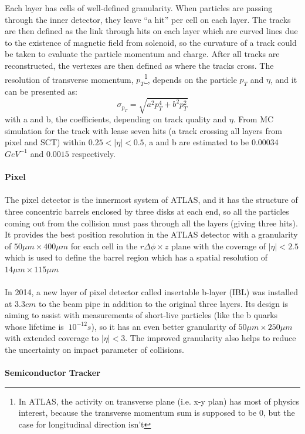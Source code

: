 Each layer has cells of well-defined granularity. When particles are passing through the inner detector, they leave ``a hit'' per cell on each layer. The tracks are then defined as the link through hits on each layer which are curved lines due to the existence of magnetic field from solenoid, so the curvature of a track could be taken to evaluate the particle momentum and charge. After all tracks are reconstructed, the vertexes are then defined as where the tracks cross. The resolution of transverse momentum, $p_{T}$\footnote{In ATLAS, the activity on transverse plane (i.e. x-y plan) has most of physics interest, because the transverse momentum sum is supposed to be 0, but the case for longitudinal direction isn't}, depends on the particle $p_{T}$ and $\eta$, and it can be presented as:
\begin{equation}
\sigma_{p_{T}} = \sqrt{a^{2}p_{T}^{4}+b^{2}p_{T}^{2}}
\end{equation}
with a and b, the coefficients, depending on track quality and $\eta$. From MC simulation for the track with lease seven hits (a track crossing all layers from pixel and SCT) within $0.25<|\eta|<0.5$, a and b are estimated to be 0.00034 $GeV^{-1}$ and $0.0015$ respectively.
\\
\\{\bf Pixel}
\\
\\The pixel detector is the innermost system of ATLAS, and it has the structure of three concentric barrels enclosed by three disks at each end, so all the particles coming out from the collision must pass through all the layers (giving three hits). It provides the best position resolution in the ATLAS detector with a granularity of $50\mu m\times 400\mu m$  for each cell in the $r\Delta \phi \times z$ plane with the coverage of $|\eta|<2.5$ which is used to define the barrel region which has a spatial resolution of $14\mu m\times 115\mu m$
\\
\\In 2014, a new layer of pixel detector called insertable b-layer (IBL) was installed at $3.3cm$ to the beam pipe in addition to the original three layers. Its design is aiming to assist with measurements of short-live particles (like the b quarks whose lifetime is $~10^{-12}s$), so it has an even better granularity of $50\mu m\times 250\mu m$ with extended coverage to $|\eta|<3$. The improved granularity also helps to reduce the uncertainty on impact parameter of collisions.
\\
\\{\bf Semiconductor Tracker}
